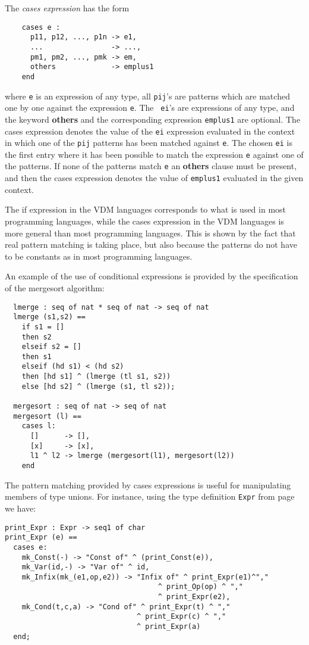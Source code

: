 \documentclass{overturerepchap}
\newcommand{\keyw}[1]{{\bf\ttfamily #1}}
\begin{document}
{\begin{description}
  The {\it cases expression} has the form
  \begin{lstlisting}
    cases e :
      p11, p12, ..., p1n -> e1,
      ...                -> ...,
      pm1, pm2, ..., pmk -> em,
      others             -> emplus1
    end
  \end{lstlisting}
  where {\tt e} is an expression of any type, all {\tt pij}'s are patterns
  which are matched one by one against the expression {\tt e}.  The {\tt
    ei}'s are expressions of any type, and the keyword \keyw{others} and
  the corresponding expression {\tt emplus1} are optional. The cases
  expression denotes the value of the {\tt ei} expression evaluated in the
  context in which one of the {\tt pij} patterns has been matched against
  {\tt e}. The chosen {\tt ei} is the first entry where it has been
  possible to match the expression {\tt e} against one of the patterns. If
  none of the patterns match {\tt e} an \keyw{others} clause must be
  present, and then the cases expression denotes the value of {\tt emplus1}
  evaluated in the given context.

\item[Examples:] The if expression in the VDM languages
  corresponds to what is used in most programming languages, while the
  cases expression in the VDM languages is more general than
  most programming languages. This is shown by the fact that real
  pattern matching is taking place, but also because the patterns do not
  have to be constants as in most programming languages.

  An example of the use of conditional expressions is provided by the
  specification of the mergesort algorithm:
  \begin{lstlisting}
  lmerge : seq of nat * seq of nat -> seq of nat
  lmerge (s1,s2) ==
    if s1 = []
    then s2
    elseif s2 = []
    then s1
    elseif (hd s1) < (hd s2)
    then [hd s1] ^ (lmerge (tl s1, s2))
    else [hd s2] ^ (lmerge (s1, tl s2));

  mergesort : seq of nat -> seq of nat
  mergesort (l) ==
    cases l:
      []      -> [],
      [x]     -> [x],
      l1 ^ l2 -> lmerge (mergesort(l1), mergesort(l2))
    end
  \end{lstlisting}
The pattern matching provided by cases expressions is useful for
  manipulating members of type unions. For instance, using the type
  definition \texttt{Expr} from page \pageref{exprdef} we have:
  \begin{lstlisting}
print_Expr : Expr -> seq1 of char
print_Expr (e) ==
  cases e:
    mk_Const(-) -> "Const of" ^ (print_Const(e)),
    mk_Var(id,-) -> "Var of" ^ id,
    mk_Infix(mk_(e1,op,e2)) -> "Infix of" ^ print_Expr(e1)^","
                                    ^ print_Op(op) ^ ","
                                    ^ print_Expr(e2),
    mk_Cond(t,c,a) -> "Cond of" ^ print_Expr(t) ^ ","
                               ^ print_Expr(c) ^ ","
                               ^ print_Expr(a)
  end;


\end{lstlisting}
\end{description}}
\end{document}
